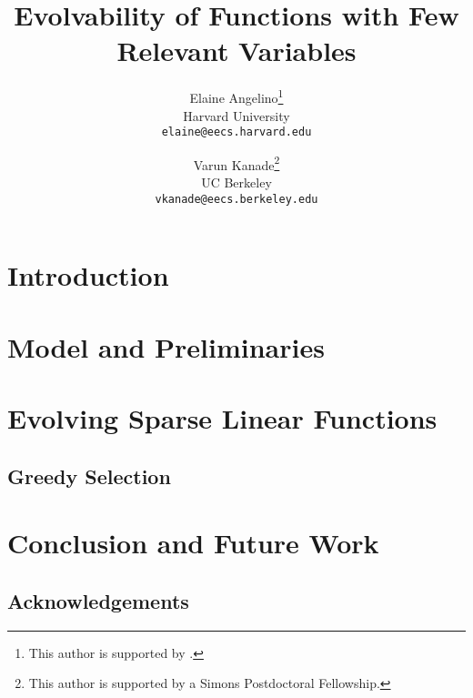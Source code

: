 \documentclass[11pt]{article}
\begin{document}
\title{Evolvability of Functions with Few Relevant Variables}
\author{Elaine Angelino\thanks{This author is supported by .} \\
Harvard University \\ \texttt{elaine@eecs.harvard.edu} \and Varun
Kanade\thanks{This author is supported by a Simons Postdoctoral Fellowship.} \\
UC Berkeley \\ \texttt{vkanade@eecs.berkeley.edu}}

\maketitle

\begin{abstract}

\end{abstract}

\newpage

\section{Introduction}
\label{sec:introduction}


\section{Model and Preliminaries}
\label{sec:notation}


\section{Evolving Sparse Linear Functions}
\label{sec:sparse_linear}


\subsection{Greedy Selection}
\label{sec:greedy}


% 
% 
% 

\section{Conclusion and Future Work}
\label{sec:conclusion}


\subsection*{Acknowledgements} 



\end{document}
